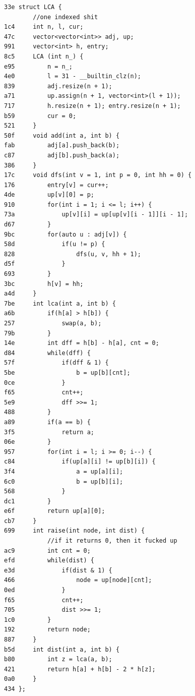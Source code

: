 \documentclass[11pt, a4paper, twoside]{article}
\begin{document}
\begin{lstlisting}
33e struct LCA {
        //one indexed shit
1c4     int n, l, cur;
47c     vector<vector<int>> adj, up;
991     vector<int> h, entry;
8c5     LCA (int n_) {
e95         n = n_;
4e0         l = 31 - __builtin_clz(n);
839         adj.resize(n + 1);
a71         up.assign(n + 1, vector<int>(l + 1));
717         h.resize(n + 1); entry.resize(n + 1);
b59         cur = 0;
521     }
50f     void add(int a, int b) {
fab         adj[a].push_back(b);
c87         adj[b].push_back(a);
386     }
17c     void dfs(int v = 1, int p = 0, int hh = 0) {
176         entry[v] = cur++;
4de         up[v][0] = p;
910         for(int i = 1; i <= l; i++) {
73a             up[v][i] = up[up[v][i - 1]][i - 1];
d67         }
9bc         for(auto u : adj[v]) {
58d             if(u != p) {
828                 dfs(u, v, hh + 1);
d5f             }
693         }
3bc         h[v] = hh;
a4d     }
7be     int lca(int a, int b) {
a6b         if(h[a] > h[b]) {
257             swap(a, b);
79b         }
14e         int dff = h[b] - h[a], cnt = 0;
d84         while(dff) {
57f             if(dff & 1) {
5be                 b = up[b][cnt];
0ce             }
f65             cnt++;
5e9             dff >>= 1;
488         }
a89         if(a == b) {
3f5             return a;
06e         }
957         for(int i = l; i >= 0; i--) {
c84             if(up[a][i] != up[b][i]) {
3f4                 a = up[a][i];
6c0                 b = up[b][i];
568             }
dc1         }
e6f         return up[a][0];
cb7     }
699     int raise(int node, int dist) {
            //if it returns 0, then it fucked up
ac9         int cnt = 0;
efd         while(dist) {
e3d             if(dist & 1) {
466                 node = up[node][cnt];
0ed             }
f65             cnt++;
705             dist >>= 1;
1c0         }
192         return node;
887     }
b5d     int dist(int a, int b) {
b80         int z = lca(a, b);
421         return h[a] + h[b] - 2 * h[z];
0a0     }
434 };
\end{lstlisting}
\end{document}
